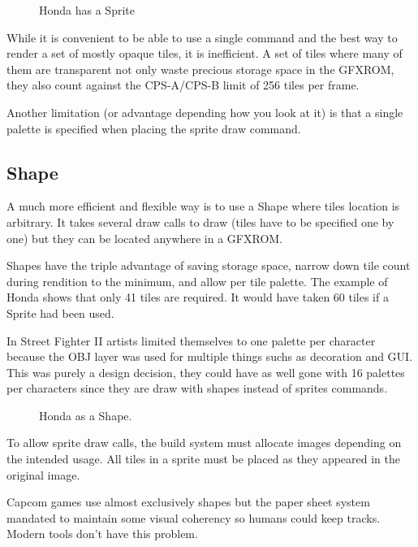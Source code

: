  \begin{figure}[H]
\caption*{Honda has a Sprite}
\end{figure}

While it is convenient to be able to use a single command and the best way to render a set of mostly opaque tiles, it is inefficient. A set of tiles where many of them are transparent not only waste precious storage space in the GFXROM, they also count against the CPS-A/CPS-B limit of 256 tiles per frame.

Another limitation (or advantage depending how you look at it) is that a single palette is specified when placing the sprite draw command.

\subsection{Shape}

A much more efficient and flexible way is to use a Shape where tiles location is arbitrary. It takes several draw calls to draw (tiles have to be specified one by one) but they can be located anywhere in a GFXROM.

Shapes have the triple advantage of saving storage space, narrow down tile count during rendition to the minimum, and allow per tile palette. The example of Honda shows that only 41 tiles are required. It would have taken 60 tiles if a Sprite had been used.

\begin{trivia}
In Street Fighter II artists limited themselves to one palette per character because the OBJ layer was used for multiple things suchs as decoration and GUI. This was purely a design decision, they could have as well gone with 16 palettes per characters since they are draw with shapes instead of sprites commands. 
\end{trivia}

 \begin{figure}[H]
\caption*{Honda as a Shape.}
\end{figure}


To allow sprite draw calls, the build system must allocate images depending on the intended usage. All tiles in a sprite must be placed as they appeared in the original image.
 

Capcom games use almost exclusively shapes but the paper sheet system mandated to maintain some visual coherency so humans could keep tracks. Modern tools don't have this problem. 

